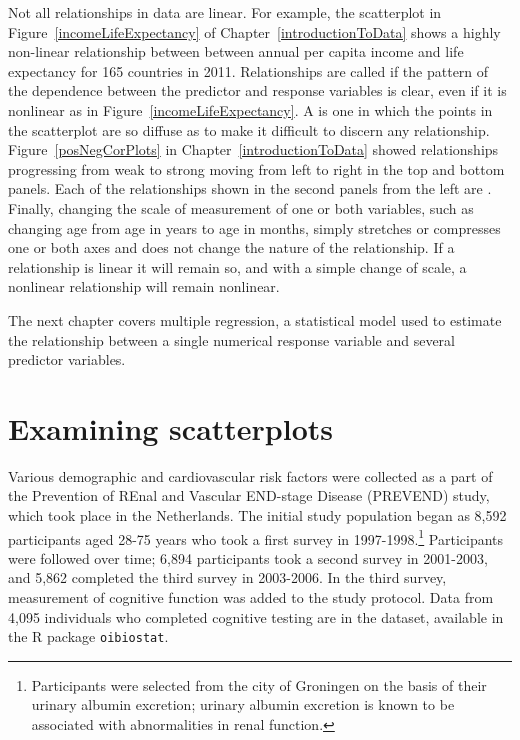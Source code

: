 {Not all relationships in data are linear.  For example, the scatterplot in Figure~\ref{incomeLifeExpectancy} of Chapter~\ref{introductionToData} shows a highly non-linear relationship between between annual per capita income and life expectancy for 165 countries in 2011.  Relationships are called  if the pattern of the dependence between the predictor and response variables is clear, even if it is nonlinear as in Figure~\ref{incomeLifeExpectancy}.  A  is one in which the points in the scatterplot are so diffuse as to make it difficult to discern any relationship.  Figure~\ref{posNegCorPlots} in Chapter~\ref{introductionToData} showed relationships progressing from weak to strong moving from left to right in the top and bottom panels.  Each of the relationships shown in the second panels from the left are .  Finally, changing the scale of measurement of one or both variables, such as changing age from age in years to age in months, simply stretches or compresses one or both axes and does not change the nature of the relationship.  If a relationship is linear it will remain so, and with a simple change of scale, a nonlinear relationship will remain nonlinear.

\textD{\newpage}

The next chapter covers multiple regression, a statistical model used to estimate the relationship between a single numerical response variable and several predictor variables.}


\section{Examining scatterplots}
\label{examiningScatterPlots}



Various demographic and cardiovascular risk factors were collected as a part of the Prevention of REnal and Vascular END-stage Disease (PREVEND) study, which took place in the Netherlands. The initial study population began as 8,592 participants aged 28-75 years who took a first survey in 1997-1998.\footnote{Participants were selected from the city of Groningen on the basis of their urinary albumin excretion; urinary albumin excretion is known to be associated with abnormalities in renal function.} Participants were followed over time; 6,894 participants took a second survey in 2001-2003, and 5,862 completed the third survey in 2003-2006. In the third survey, measurement of cognitive function was added to the study protocol. Data from 4,095 individuals who completed cognitive testing are in the  dataset, available in the \textsf{R} package  \texttt{oibiostat}. 

